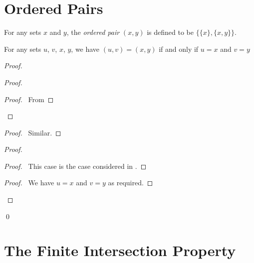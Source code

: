 \section{Ordered Pairs}

\begin{definition}
    For any sets $x$ and $y$, the \emph{ordered pair} $(x,y)$ is defined to be $\{ \{ x \}, \{ x , y \} \}$.    
\end{definition}

\begin{theorem}
    For any sets $u$, $v$, $x$, $y$, we have $(u,v) = (x,y)$ if and only if $u = x$ and $v = y$
\end{theorem}

\begin{proof}
    \pf
    \begin{proof}
        \begin{proof}
            \pf\ From 
        \end{proof}
    \end{proof}
    \begin{proof}
        \pf\ Similar.
    \end{proof}
    \begin{proof}
        \begin{proof}
            \pf\ This case is the case considered in .
        \end{proof}
        \begin{proof}
            \pf\ We have $u = x$ and $v = y$ as required.
        \end{proof}
    \end{proof}
    \qed
\end{proof}

\section{The Finite Intersection Property}

